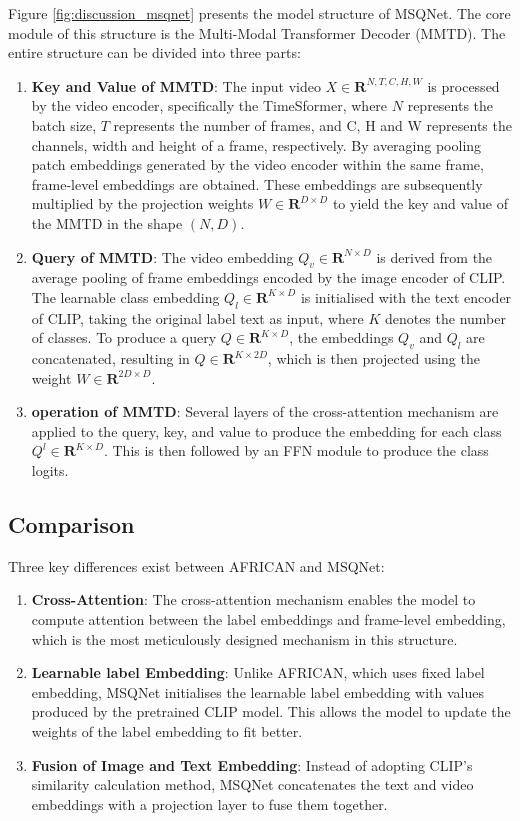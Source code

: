 Figure \ref{fig:discussion_msqnet} presents the model structure of MSQNet. The core module of this structure is the Multi-Modal Transformer Decoder (MMTD). The entire structure can be divided into three parts: 

\begin{enumerate}
    \item \textbf{Key and Value of MMTD}: The input video $X \in \mathbf{R}^{N, T, C, H, W}$ is processed by the video encoder, specifically the TimeSformer, where $N$ represents the batch size, $T$ represents the number of frames, and C, H and W represents the channels, width and height of a frame, respectively. By averaging pooling patch embeddings generated by the video encoder within the same frame, frame-level embeddings are obtained. These embeddings are subsequently multiplied by the projection weights $W \in \mathbf{R}^{D \times D}$ to yield the key and value of the MMTD in the shape $(N, D)$. 
    \item \textbf{Query of MMTD}: The video embedding $Q_v \in \mathbf{R}^{N \times D}$ is derived from the average pooling of frame embeddings encoded by the image encoder of CLIP. The learnable class embedding $Q_l \in \mathbf{R}^{K \times D}$ is initialised with the text encoder of CLIP, taking the original label text as input, where $K$ denotes the number of classes. To produce a query $Q \in \mathbf{R}^{K \times D}$, the embeddings $Q_v$ and $Q_l$ are concatenated, resulting in $Q \in \mathbf{R}^{K \times 2D}$, which is then projected using the weight $W \in \mathbf{R}^{2D \times D}$. 
    \item \textbf{operation of MMTD}: Several layers of the cross-attention mechanism are applied to the query, key, and value to produce the embedding for each class $Q^l \in \mathbf{R}^{K \times D}$. This is then followed by an FFN module to produce the class logits.
\end{enumerate}

\subsection{Comparison}
Three key differences exist between AFRICAN and MSQNet: 

\begin{enumerate}
    \item \textbf{Cross-Attention}: The cross-attention mechanism enables the model to compute attention between the label embeddings and frame-level embedding, which is the most meticulously designed mechanism in this structure.
    \item \textbf{Learnable label Embedding}: Unlike AFRICAN, which uses fixed label embedding, MSQNet initialises the learnable label embedding with values produced by the pretrained CLIP model. This allows the model to update the weights of the label embedding to fit better.
    \item \textbf{Fusion of Image and Text Embedding}: Instead of adopting CLIP's similarity calculation method, MSQNet concatenates the text and video embeddings with a projection layer to fuse them together. 
\end{enumerate}

